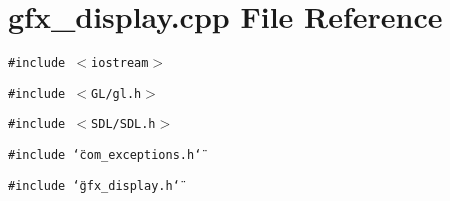 \section{gfx\_\-display.cpp File Reference}
\label{gfx__display_8cpp}
{\tt \#include $<$iostream$>$}\par
{\tt \#include $<$GL/gl.h$>$}\par
{\tt \#include $<$SDL/SDL.h$>$}\par
{\tt \#include \char`\"{}com\_\-exceptions.h\char`\"{}}\par
{\tt \#include \char`\"{}gfx\_\-display.h\char`\"{}}\par
